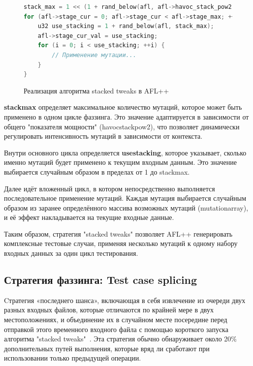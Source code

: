 \begin{figure}[ht]
	\begin{lstlisting}[language=C]
	stack_max = 1 << (1 + rand_below(afl, afl->havoc_stack_pow2));
for (afl->stage_cur = 0; afl->stage_cur < afl->stage_max; ++afl->stage_cur) {
	u32 use_stacking = 1 + rand_below(afl, stack_max);
	afl->stage_cur_val = use_stacking;
	for (i = 0; i < use_stacking; ++i) {
		// Применение мутации...
	}
}
	\end{lstlisting}
	\caption{Реализация алгоритма stacked tweaks в AFL++}\label{fig:stacked-tweaks}
\end{figure}
\textbf{stack\textunderscore max} определяет максимальное количество мутаций, которое может быть применено в одном цикле фаззинга. Это значение адаптируется в зависимости от общего "показателя мощности" (havoc\textunderscore stack\textunderscore pow2), что позволяет динамически регулировать интенсивность мутаций в зависимости от контекста.

Внутри основного цикла определяется \textbf{use\textunderscore stacking}, которое указывает, сколько именно мутаций будет применено к текущим входным данным. Это значение выбирается случайным образом в пределах от 1 до stack\textunderscore max.

Далее идёт вложенный цикл, в котором непосредственно выполняется последовательное применение мутаций. Каждая мутация выбирается случайным образом из заранее определённого массива возможных мутаций (mutation\textunderscore array), и её эффект накладывается на текущие входные данные.

Таким образом, стратегия "stacked tweaks" позволяет AFL++ генерировать комплексные тестовые случаи, применяя несколько мутаций к одному набору входных данных за один цикл тестирования.

\subsection{Стратегия фаззинга: Test case splicing} \label{ch2:test-case-splicing}
Cтратегия «последнего шанса», включающая в себя извлечение из очереди двух разных входных файлов, которые отличаются по крайней мере в двух местоположениях, и объединение их в случайном месте посередине перед отправкой этого временного входного файла с помощью короткого запуска алгоритма "stacked tweaks"~\cite{???}. Эта стратегия обычно обнаруживает около 20\% дополнительных путей выполнения, которые вряд ли сработают при использовании только предыдущей операции.

